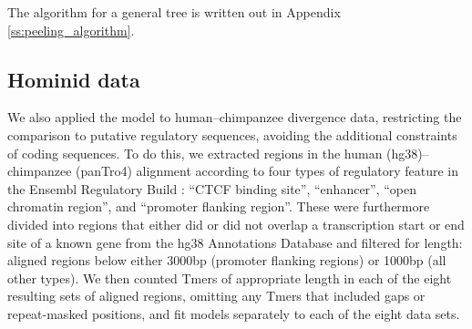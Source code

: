 \documentclass{article}
\theoremstyle{plain}
\theoremstyle{definition}
\begin{document}
The algorithm for a general tree is written out in Appendix \ref{ss:peeling_algorithm}.


\subsection{Hominid data}
\label{hominid_section}

We also applied the model to human--chimpanzee divergence data,
restricting the comparison to putative regulatory sequences,
avoiding the additional constraints of coding sequences.
To do this, we extracted regions in the human (hg38)--chimpanzee (panTro4) alignment %
according to four types of regulatory feature in the Ensembl Regulatory Build \citep[release 81][]{zerbino2015ensembl}:
``CTCF binding site'', ``enhancer'', ``open chromatin region'', and ``promoter flanking region''.
These were furthermore divided into regions that either did or did not overlap a transcription start or end site of a known gene
from the hg38 Annotations Database \citep{kent2002human}
and filtered for length:
aligned regions below either 3000bp (promoter flanking regions) or 1000bp (all other types).
We then counted Tmers of appropriate length in each of the eight resulting sets of aligned regions, omitting any Tmers that included gaps or repeat-masked positions,
and fit models separately to each of the eight data sets.
\end{document}
